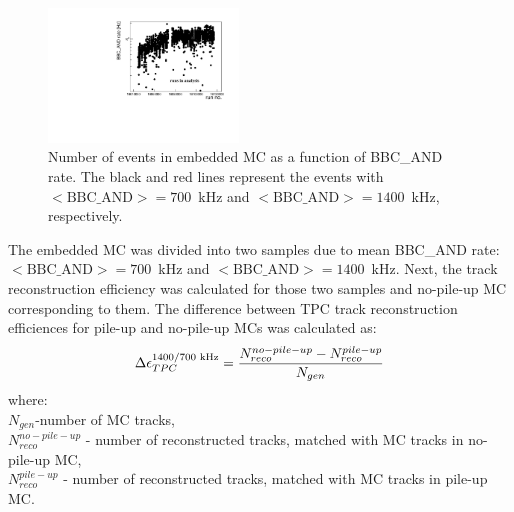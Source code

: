 \begin{figure}\vspace*{-9pt}
	\centering
	\includegraphics[width=0.45\textwidth, page=5]{graphics/systematicsEfficiency/bbc_and/Out.pdf}
	\caption[Number of events in embedded MC as a function of BBC\_AND rate.]
	{Number of events in embedded MC as a function of BBC\_AND rate. The black and red lines represent the events with \mbox{$<\text{BBC\_AND}>=700$~kHz} and \mbox{$<\text{BBC\_AND}>=1400$~kHz},  respectively.}
	\label{fig:events_bbc_and}%
\end{figure}
\noindent The embedded MC was divided into two samples due to mean BBC\_AND rate: \mbox{$<\text{BBC\_AND}>=700$~kHz} and \mbox{$<\text{BBC\_AND}>=1400$~kHz}. Next, the track reconstruction efficiency was calculated for those two samples and no-pile-up MC corresponding to them. The difference between TPC track reconstruction efficiences for pile-up and no-pile-up MCs was calculated as:
\begin{equation}
	\Delta\epsilon_{ TPC}^{1400/700\text{ kHz}} = \frac{N_{reco}^{no-pile-up}-N_{reco}^{pile-up}}{N_{gen}}\\
	\label{eq:tpcSyst}
\end{equation}
where:\\
$N_{gen}$-number of MC tracks,\\
$N_{reco}^{no-pile-up}$ - number of reconstructed tracks, matched with MC tracks in no-pile-up MC,\\
$N_{reco}^{pile-up}$ - number of reconstructed tracks, matched with MC tracks in pile-up MC.

